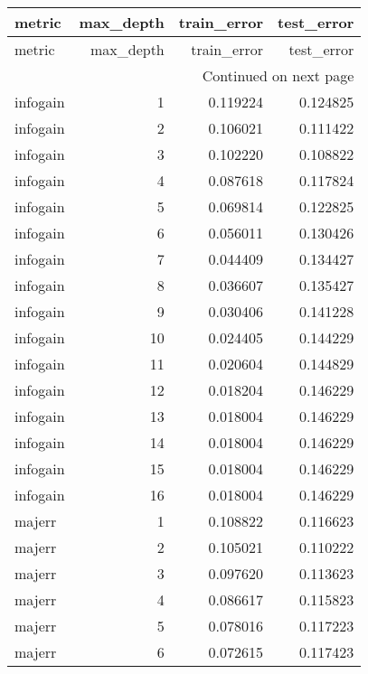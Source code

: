 \begin{longtable}{lrrr}
\toprule
  metric &  max\_depth &  train\_error &  test\_error \\
\midrule
\endfirsthead

\toprule
  metric &  max\_depth &  train\_error &  test\_error \\
\midrule
\endhead
\midrule
\multicolumn{4}{r}{{Continued on next page}} \\
\midrule
\endfoot

\bottomrule
\endlastfoot
infogain &          1 &     0.119224 &    0.124825 \\
infogain &          2 &     0.106021 &    0.111422 \\
infogain &          3 &     0.102220 &    0.108822 \\
infogain &          4 &     0.087618 &    0.117824 \\
infogain &          5 &     0.069814 &    0.122825 \\
infogain &          6 &     0.056011 &    0.130426 \\
infogain &          7 &     0.044409 &    0.134427 \\
infogain &          8 &     0.036607 &    0.135427 \\
infogain &          9 &     0.030406 &    0.141228 \\
infogain &         10 &     0.024405 &    0.144229 \\
infogain &         11 &     0.020604 &    0.144829 \\
infogain &         12 &     0.018204 &    0.146229 \\
infogain &         13 &     0.018004 &    0.146229 \\
infogain &         14 &     0.018004 &    0.146229 \\
infogain &         15 &     0.018004 &    0.146229 \\
infogain &         16 &     0.018004 &    0.146229 \\
  majerr &          1 &     0.108822 &    0.116623 \\
  majerr &          2 &     0.105021 &    0.110222 \\
  majerr &          3 &     0.097620 &    0.113623 \\
  majerr &          4 &     0.086617 &    0.115823 \\
  majerr &          5 &     0.078016 &    0.117223 \\
  majerr &          6 &     0.072615 &    0.117423 \\

\end{longtable}
